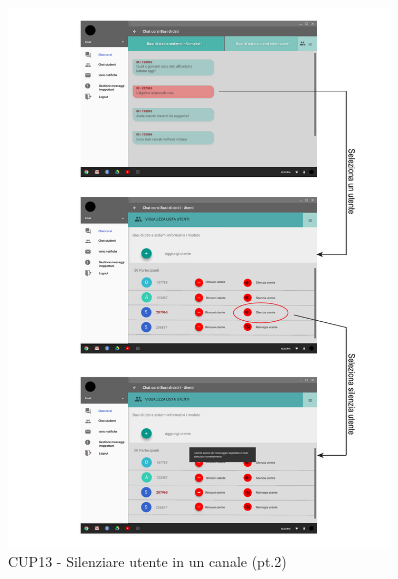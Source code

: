 \begin{figure}
	\centering
	\includegraphics[width=0.9\textwidth]{imgs/gruppo6/activities/act_cup13_silenziare_utente2.pdf}
	\caption{CUP13 - Silenziare utente in un canale (pt.2)}
	\label{fig:cup13-2}
\end{figure}

